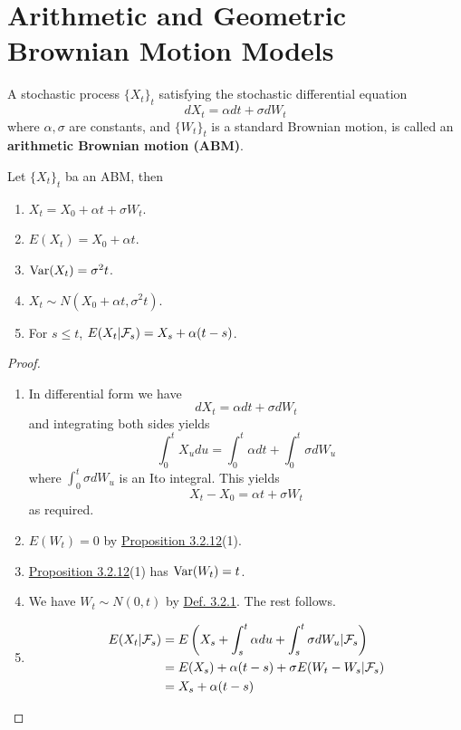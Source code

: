 \documentclass[11pt,fleqn]{book} %
\begin{document}

\section{Arithmetic and Geometric Brownian Motion Models}

\begin{definition} \label{def:341}
A stochastic process \(\{X_t\}_t\) satisfying the stochastic differential equation
\[
dX_t = \alpha dt + \sigma dW_t
\]
where \(\alpha, \sigma\) are constants, and \(\{W_t\}_t\) is a standard Brownian motion, is called an \textbf{arithmetic Brownian motion (ABM)}.
\end{definition}

\begin{proposition} \label{prop:342}
Let \(\{X_t\}_t\) ba an ABM, then
\begin{enumerate}
    \item \(X_t = X_0 + \alpha t + \sigma W_t\).
    \item \(E(X_t) = X_0 + \alpha t\).
    \item \(\operatorname{Var}(X_t) = \sigma^2t\).
    \item \(X_t \sim N(X_0 + \alpha t, \sigma^2t)\).
    \item For \(s \leq t\), \(E(X_t | \mathcal{F}_s) = X_s + \alpha(t - s)\).
\end{enumerate}
\end{proposition}
\begin{proof}
\begin{enumerate}
    \item In differential form we have
    \[
    dX_t = \alpha dt + \sigma dW_t
    \]
    and integrating both sides yields
    \[
    \int_0^t X_udu = \int_0^t \alpha dt + \int_0^t\sigma dW_u
    \]
    where \(\int_0^t\sigma dW_u\) is an Ito integral. This yields
    \[
    X_t - X_0 = \alpha t + \sigma W_t
    \]
    as required.
    \item \(E(W_t) = 0\) by \hyperref[prop:3212]{Proposition 3.2.12}(1).
    \item \hyperref[prop:3212]{Proposition 3.2.12}(1) has \(\operatorname{Var}(W_t) = t\).
    \item We have \(W_t \sim N(0, t)\) by \hyperref[def:321]{Def. 3.2.1}. The rest follows.
    \item \[
    \begin{aligned}
    E(X_t|\mathcal{F}_s) &= E\left(X_s + \int_s^t \alpha du + \int_s^t \sigma dW_u | \mathcal{F}_s\right) \\
    &= E(X_s) + \alpha(t - s) + \sigma E(W_t - W_s|\mathcal{F}_s) \\
    &= X_s + \alpha(t - s)
    \end{aligned}
    \]
\end{enumerate}
\end{proof}
\end{document}
